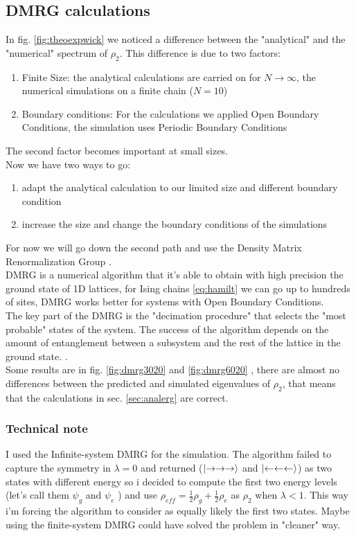 \documentclass[10pt,a4paper]{article}
\begin{document}
\subsection{DMRG calculations}
In fig. \ref{fig:theoexpwick} we noticed a difference between the "analytical" and the "numerical" spectrum of $\rho_2$. This difference is due to two factors:
\begin{enumerate}
	\item Finite Size: the analytical calculations are carried on for $N\rightarrow\infty$, the numerical simulations on a finite chain ($N=10$)
	\item Boundary conditions: For the calculations we applied Open Boundary Conditions, the simulation uses Periodic Boundary Conditions
\end{enumerate} 
The second factor becomes important at small sizes.\\
Now we have two ways to go:
\begin{enumerate}
\item adapt the analytical calculation to our limited size and different boundary condition 
\item increase the size and change the boundary conditions of the simulations
\end{enumerate}
For now we will go down the second path and use the Density Matrix Renormalization Group \cite{PhysRevLett.69.2863}.\\
DMRG is a numerical algorithm that it's able to obtain with high precision the ground state of 1D lattices, for Ising chains \ref{eq:hamilt} we can go up to hundreds of sites,
DMRG  works better for systems with Open Boundary Conditions.\\
The key part of the DMRG is the "decimation procedure" that selects the "most probable" states of the system. The success of the algorithm depends on the amount of entanglement between a subsystem and the rest of the lattice in the ground state. \cite{De_Chiara_2008}.\\
Some results are in fig. \ref{fig:dmrg3020} and \ref{fig:dmrg6020} , there are almost no differences between the predicted and simulated eigenvalues of $\rho_2$, that means that the calculations in sec. \ref{sec:analerg} are correct. \\

\subsubsection{Technical note}\label{sec:technicdmrg}
I used the Infinite-system DMRG for the simulation. The algorithm failed to capture the symmetry in $\lambda=0$ and returned ($\ket{\rightarrow\rightarrow\rightarrow}$ and $\ket{\leftarrow\leftarrow\leftarrow}$) as two states with different energy so i decided to compute the first two energy levels (let's call them $\psi_g$ and $\psi_e$ ) and use $\rho_{eff}=\frac{1}{2}\rho_g+\frac{1}{2}\rho_e$ as $\rho_2$ when $\lambda<1$. This way i'm forcing the algorithm to consider as equally likely the first two states. Maybe using the finite-system DMRG could have solved the problem in "cleaner" way.
\end{document}
